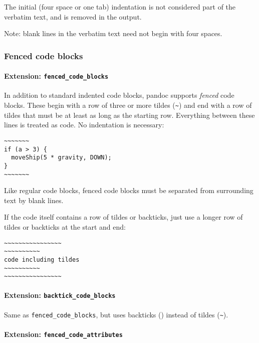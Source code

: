 \documentclass[]{article}
\let\oldparagraph\paragraph
\renewcommand{\paragraph}[1]{\oldparagraph{#1}\mbox{}}
\begin{document}
The initial (four space or one tab) indentation is not considered part
of the verbatim text, and is removed in the output.

Note: blank lines in the verbatim text need not begin with four spaces.

\hypertarget{fenced-code-blocks}{\subsubsection{Fenced code
blocks}\label{fenced-code-blocks}}

\paragraph{\texorpdfstring{Extension:
\texttt{fenced\_code\_blocks}}{Extension: fenced\_code\_blocks}}\label{extension-fenced_code_blocks}

In addition to standard indented code blocks, pandoc supports
\emph{fenced} code blocks. These begin with a row of three or more
tildes (\texttt{\textasciitilde{}}) and end with a row of tildes that
must be at least as long as the starting row. Everything between these
lines is treated as code. No indentation is necessary:

\begin{verbatim}
~~~~~~~
if (a > 3) {
  moveShip(5 * gravity, DOWN);
}
~~~~~~~
\end{verbatim}

Like regular code blocks, fenced code blocks must be separated from
surrounding text by blank lines.

If the code itself contains a row of tildes or backticks, just use a
longer row of tildes or backticks at the start and end:

\begin{verbatim}
~~~~~~~~~~~~~~~~
~~~~~~~~~~
code including tildes
~~~~~~~~~~
~~~~~~~~~~~~~~~~
\end{verbatim}

\paragraph{\texorpdfstring{Extension:
\texttt{backtick\_code\_blocks}}{Extension: backtick\_code\_blocks}}\label{extension-backtick_code_blocks}

Same as \texttt{fenced\_code\_blocks}, but uses backticks
(\texttt{\textasciigrave{}}) instead of tildes
(\texttt{\textasciitilde{}}).

\paragraph{\texorpdfstring{Extension:
\texttt{fenced\_code\_attributes}}{Extension: fenced\_code\_attributes}}\label{extension-fenced_code_attributes}
\end{document}
